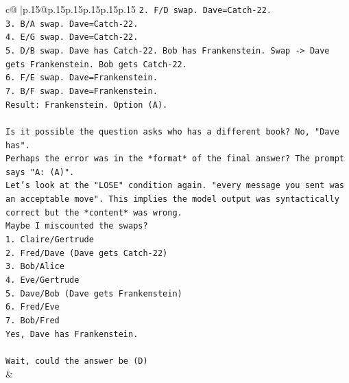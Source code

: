 \documentclass{article}
\begin{document}
{\begin{supertabular}{c@{$\;$}|p{.15\linewidth}@{}p{.15\linewidth}p{.15\linewidth}p{.15\linewidth}p{.15\linewidth}p{.15\linewidth}}
{{{\texttt{2. F/D swap. Dave=Catch{-}22.} \\
\texttt{3. B/A swap. Dave=Catch{-}22.} \\
\texttt{4. E/G swap. Dave=Catch{-}22.} \\
\texttt{5. D/B swap. Dave has Catch{-}22. Bob has Frankenstein. Swap {-}> Dave gets Frankenstein. Bob gets Catch{-}22.} \\
\texttt{6. F/E swap. Dave=Frankenstein.} \\
\texttt{7. B/F swap. Dave=Frankenstein.} \\
\texttt{Result: Frankenstein. Option (A).} \\
\\ 
\texttt{Is it possible the question asks who has a different book? No, "Dave has".} \\
\texttt{Perhaps the error was in the *format* of the final answer? The prompt says "A: (A)".} \\
\texttt{Let's look at the "LOSE" condition again. "every message you sent was an acceptable move". This implies the model output was syntactically correct but the *content* was wrong.} \\
\texttt{Maybe I miscounted the swaps?} \\
\texttt{1. Claire/Gertrude} \\
\texttt{2. Fred/Dave (Dave gets Catch{-}22)} \\
\texttt{3. Bob/Alice} \\
\texttt{4. Eve/Gertrude} \\
\texttt{5. Dave/Bob (Dave gets Frankenstein)} \\
\texttt{6. Fred/Eve} \\
\texttt{7. Bob/Fred} \\
\texttt{Yes, Dave has Frankenstein.} \\
\\ 
\texttt{Wait, could the answer be (D)} \\
            }
        }
    }
    & \\ \\

\end{supertabular}
}
\end{document}
